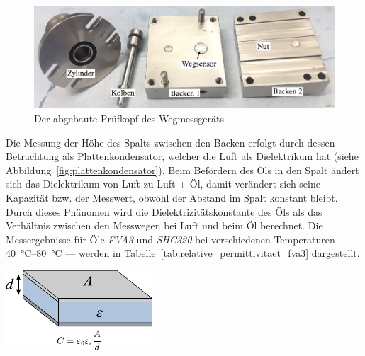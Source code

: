 \begin{figure}[htb]
    \centering
    \includegraphics[]{./images/wegmessgeraet_pruefkopf.pdf}
    \caption{Der abgebaute Prüfkopf des Wegmessgeräts}
    \label{fig:wegmessgeraet_pruefkopf}
\end{figure}

Die Messung der Höhe des Spalts zwischen den Backen erfolgt durch dessen Betrachtung als Plattenkondensator, welcher die Luft als Dielektrikum hat (siehe Abbildung~\ref{fig:plattenkondensator}).
Beim Befördern des Öls in den Spalt ändert sich das Dielektrikum von Luft zu Luft + Öl, damit verändert sich seine Kapazität bzw. der Messwert, obwohl der Abstand im Spalt konstant bleibt.
Durch dieses Phänomen wird die Dielektrizitätskonstante des Öls als das Verhältnis zwischen den Messwegen bei Luft und beim Öl berechnet.
Die Messergebnisse für Öle \textit{FVA3} und \textit{SHC320} bei verschiedenen Temperaturen --- \SIrange{40}{80}{\degreeCelsius} --- werden in Tabelle~\ref{tab:relative_permittivitaet_fva3} dargestellt.

\begin{minipage}[b]{0.55\linewidth}
    \centering
    
    \label{tab:relative_permittivitaet_fva3}
\end{minipage}
\hspace{0.5cm}
%
\begin{minipage}[b]{0.3\linewidth}
    \centering
    \includegraphics[width=\textwidth]{./images/plattenkondensator.pdf}
    \label{fig:plattenkondensator}
\end{minipage}

